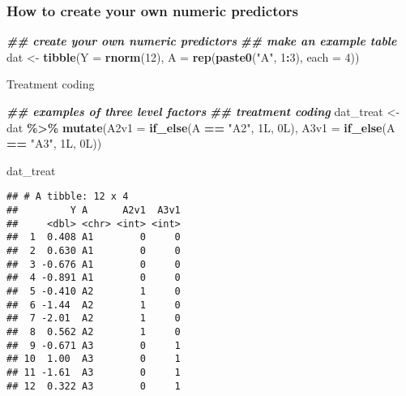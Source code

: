 \documentclass[
]{article}
\newenvironment{Shaded}{\begin{snugshade}}{\end{snugshade}}
\newcommand{\AttributeTok}[1]{\textcolor[rgb]{0.13,0.29,0.53}{#1}}
\newcommand{\DecValTok}[1]{\textcolor[rgb]{0.00,0.00,0.81}{#1}}
\newcommand{\DocumentationTok}[1]{\textcolor[rgb]{0.56,0.35,0.01}{\textbf{\textit{#1}}}}
\newcommand{\FunctionTok}[1]{\textcolor[rgb]{0.13,0.29,0.53}{\textbf{#1}}}
\newcommand{\NormalTok}[1]{#1}
\newcommand{\OtherTok}[1]{\textcolor[rgb]{0.56,0.35,0.01}{#1}}
\newcommand{\SpecialCharTok}[1]{\textcolor[rgb]{0.81,0.36,0.00}{\textbf{#1}}}
\newcommand{\StringTok}[1]{\textcolor[rgb]{0.31,0.60,0.02}{#1}}
\begin{document}
\hypertarget{how-to-create-your-own-numeric-predictors}{%
\subsubsection{How to create your own numeric
predictors}\label{how-to-create-your-own-numeric-predictors}}

\begin{Shaded}
\begin{Highlighting}[]
\DocumentationTok{\#\# create your own numeric predictors}
\DocumentationTok{\#\# make an example table}
\NormalTok{dat }\OtherTok{\textless{}{-}} \FunctionTok{tibble}\NormalTok{(}\AttributeTok{Y =} \FunctionTok{rnorm}\NormalTok{(}\DecValTok{12}\NormalTok{),}
             \AttributeTok{A =} \FunctionTok{rep}\NormalTok{(}\FunctionTok{paste0}\NormalTok{(}\StringTok{"A"}\NormalTok{, }\DecValTok{1}\SpecialCharTok{:}\DecValTok{3}\NormalTok{), }\AttributeTok{each =} \DecValTok{4}\NormalTok{))}
\end{Highlighting}
\end{Shaded}

Treatment coding

\begin{Shaded}
\begin{Highlighting}[]
\DocumentationTok{\#\# examples of three level factors}
\DocumentationTok{\#\# treatment coding}
\NormalTok{dat\_treat }\OtherTok{\textless{}{-}}\NormalTok{ dat }\SpecialCharTok{\%\textgreater{}\%}
  \FunctionTok{mutate}\NormalTok{(}\AttributeTok{A2v1 =} \FunctionTok{if\_else}\NormalTok{(A }\SpecialCharTok{==} \StringTok{"A2"}\NormalTok{, 1L, 0L),}
     \AttributeTok{A3v1 =} \FunctionTok{if\_else}\NormalTok{(A }\SpecialCharTok{==} \StringTok{"A3"}\NormalTok{, 1L, 0L))}

\NormalTok{dat\_treat}
\end{Highlighting}
\end{Shaded}

\begin{verbatim}
## # A tibble: 12 x 4
##         Y A      A2v1  A3v1
##     <dbl> <chr> <int> <int>
##  1  0.408 A1        0     0
##  2  0.630 A1        0     0
##  3 -0.676 A1        0     0
##  4 -0.891 A1        0     0
##  5 -0.410 A2        1     0
##  6 -1.44  A2        1     0
##  7 -2.01  A2        1     0
##  8  0.562 A2        1     0
##  9 -0.671 A3        0     1
## 10  1.00  A3        0     1
## 11 -1.61  A3        0     1
## 12  0.322 A3        0     1
\end{verbatim}
\end{document}
